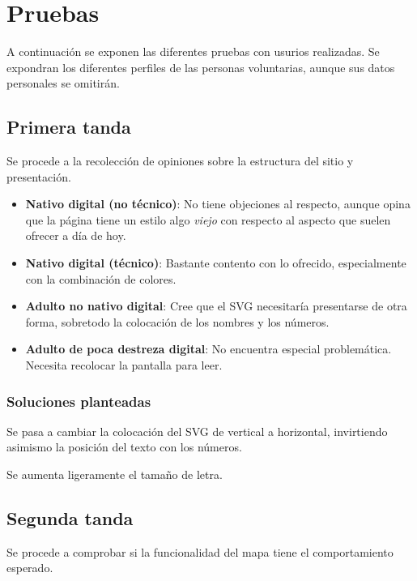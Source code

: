 \documentclass[11pt]{article}
\begin{document}
        \section{Pruebas}
        A continuación se exponen las diferentes pruebas con usurios realizadas.
        Se expondran los diferentes perfiles de las personas voluntarias, aunque sus datos personales se omitirán.

        \subsection{Primera tanda}
        Se procede a la recolección de opiniones sobre la estructura del sitio y presentación.

        \begin{itemize}
            \item \textbf{Nativo digital (no técnico)}: No tiene objeciones al respecto, aunque opina que la página tiene un estilo algo \textit{viejo} con respecto al aspecto que suelen ofrecer a día de hoy.
            \item \textbf{Nativo digital (técnico)}: Bastante contento con lo ofrecido, especialmente con la combinación de colores.
            \item \textbf{Adulto no nativo digital}: Cree que el SVG necesitaría presentarse de otra forma, sobretodo la colocación de los nombres y los números.
            \item \textbf{Adulto de poca destreza digital}: No encuentra especial problemática. Necesita recolocar la pantalla para leer.
        \end{itemize}

        \subsubsection{Soluciones planteadas}
        Se pasa a cambiar la colocación del SVG de vertical a horizontal, invirtiendo asimismo la posición del texto con los números.

        Se aumenta ligeramente el tamaño de letra.

        \subsection{Segunda tanda}
        Se procede a comprobar si la funcionalidad del mapa tiene el comportamiento esperado.
\end{document}
